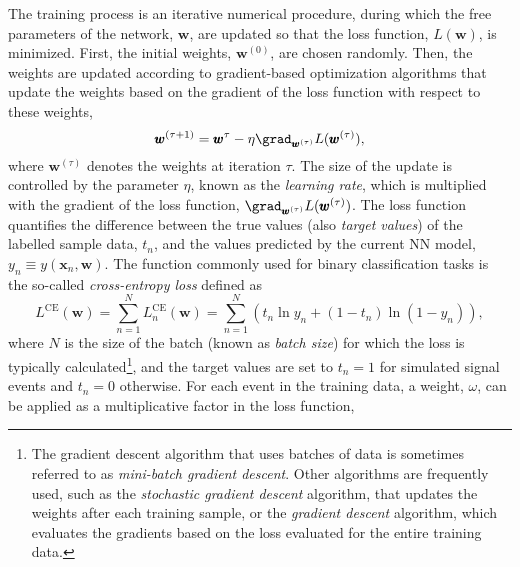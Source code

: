 The training process is an iterative numerical procedure, during which the free parameters of the network, $\pmb{w}$, are updated so that the loss function, $L(\pmb{w})$, is minimized. 
First, the initial weights, $\pmb{w}^{(0)}$, are chosen randomly. Then, the weights are updated according to gradient-based optimization algorithms that update the weights based on the gradient of the loss function with respect to these weights, 
\begin{equation}
    \label{eq:gradient-descent}
    \pmb{w}^{(\tau+1)} = \pmb{w}^\tau - \eta \grad_{\pmb{w}^{(\tau)}} L(\pmb{w}^{(\tau)}),
\end{equation}
where $\pmb{w}^{(\tau)}$ denotes the weights at iteration $\tau$.
The size of the update is controlled by the parameter $\eta$, known as the \emph{learning rate}, which is multiplied with the gradient of the loss function, $\grad_{\pmb{w}^{(\tau)}} L(\pmb{w}^{(\tau)})$.
The loss function quantifies the difference between the true values (also \emph{target values}) of the labelled sample data, $t_n$, and the values predicted by the current NN model, $y_n \equiv y(\pmb{x}_n, \pmb{w})$. 
The function commonly used for binary classification tasks is the so-called \emph{cross-entropy loss} defined as
\begin{equation}
    \label{eq:cross-entropy-loss}
    L^{\text{CE}}(\pmb{w}) = \sum _{n=1}^{N}L_n^{\text{CE}}(\pmb{w}) = \sum _{n=1}^{N}\left( t_n \ln y_n + ( 1 - t_n) \ln (1 - y_n) \right),
\end{equation}
where $N$ is the size of the batch (known as \emph{batch size}) for which the loss is typically calculated\footnote{The gradient descent algorithm that uses batches of data is sometimes referred to as \emph{mini-batch gradient descent}. Other algorithms are frequently used, such as the \emph{stochastic gradient descent} algorithm, that updates the weights after each training sample, or the \emph{gradient descent} algorithm, which evaluates the gradients based on the loss evaluated for the entire training data.}, and the target values are set to $t_n = 1$ for simulated signal events and $t_n = 0$ otherwise.
For each event in the training data, a weight, $\omega$, can be applied as a multiplicative factor in the loss function, 
